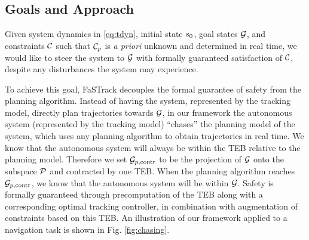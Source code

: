 \subsection{Goals and Approach}
Given system dynamics in \eqref{eq:tdyn}, initial state $s_0$, goal states $\mathcal G$, and constraints $\mathcal C$ such that $\mathcal C_p$ is \textit{a priori} unknown and determined in real time, we would like to steer the system to $\mathcal G$ with formally guaranteed satisfaction of $\mathcal C$, despite any disturbances the system may experience.

To achieve this goal, FaSTrack decouples the formal guarantee of safety from the planning algorithm.
Instead of having the system, represented by the tracking model, directly plan trajectories towards $\mathcal G$, in our framework the autonomous system (represented by the tracking model) ``chases'' the planning model of the system, which uses any planning algorithm to obtain trajectories in real time.
We know that the autonomous system will always be within the TEB relative to the planning model. Therefore we set $\mathcal G_{p,\text{contr}}$ to be the projection of $\mathcal G$ onto the subspace $\mathcal{P}$ and contracted by one TEB.  When the planning algorithm reaches $\mathcal G_{p,\text{contr}}$, we know that the autonomous system will be within $\mathcal G$.
Safety is formally guaranteed through precomputation of the TEB along with a corresponding optimal tracking controller, in combination with augmentation of constraints based on this TEB.
An illustration of our framework applied to a navigation task is shown in Fig. \ref{fig:chasing}.